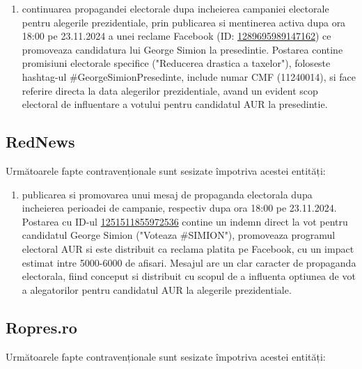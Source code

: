 \documentclass[a4paper,12pt]{article}
\begin{document}
\begin{enumerate}[leftmargin=*, label=\arabic*.)]
    \item continuarea propagandei electorale dupa incheierea campaniei electorale pentru alegerile prezidentiale, prin publicarea si mentinerea activa dupa ora 18:00 pe 23.11.2024 a unei reclame Facebook (ID: \href{https://www.facebook.com/ads/library/?id=1289695989147162}{1289695989147162}) ce promoveaza candidatura lui George Simion la presedintie. Postarea contine promisiuni electorale specifice ("Reducerea drastica a taxelor"), foloseste hashtag-ul \#GeorgeSimionPresedinte, include numar CMF (11240014), si face referire directa la data alegerilor prezidentiale, avand un evident scop electoral de influentare a votului pentru candidatul AUR la presedintie.
\end{enumerate}

\vspace{0.5cm}

\subsection{RedNews}
Următoarele fapte contravenționale sunt sesizate împotriva acestei entități:

\begin{enumerate}[leftmargin=*, label=\arabic*.)]
    \item publicarea si promovarea unui mesaj de propaganda electorala dupa incheierea perioadei de campanie, respectiv dupa ora 18:00 pe 23.11.2024. Postarea cu ID-ul \href{https://www.facebook.com/ads/library/?id=1251511855972536}{1251511855972536} contine un indemn direct la vot pentru candidatul George Simion ("Voteaza \#SIMION"), promoveaza programul electoral AUR si este distribuit ca reclama platita pe Facebook, cu un impact estimat intre 5000-6000 de afisari. Mesajul are un clar caracter de propaganda electorala, fiind conceput si distribuit cu scopul de a influenta optiunea de vot a alegatorilor pentru candidatul AUR la alegerile prezidentiale.
\end{enumerate}

\vspace{0.5cm}

\subsection{Ropres.ro}
Următoarele fapte contravenționale sunt sesizate împotriva acestei entități:
\end{document}

